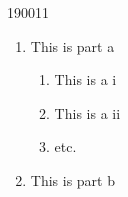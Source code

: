 \documentclass[10pt,twoside,a4paper]{article}
\begin{document}

\begin{examquestion}{1900}{1}{1}
 \begin{enumerate}
  \item This is part a
  \begin{enumerate}
   \item This is a i
   \item This is a ii
   \item etc.
  \end{enumerate}
  \item This is part b
 \end{enumerate}
\end{examquestion}
\end{document}
